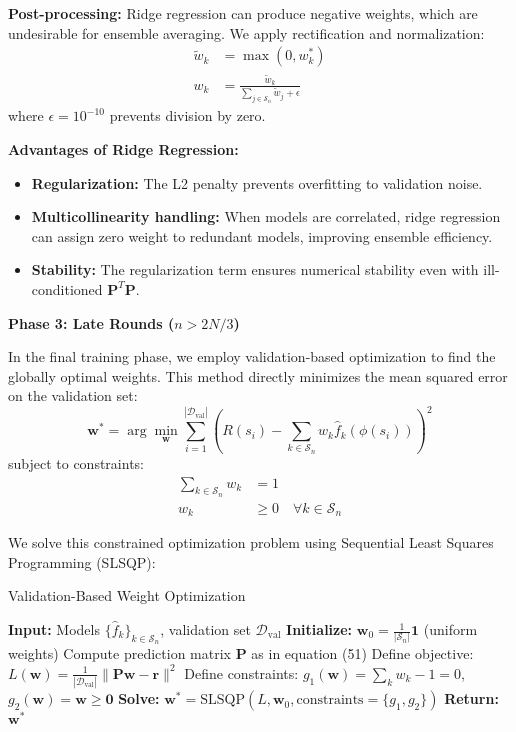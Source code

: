 \documentclass[conference]{IEEEtran}
\begin{document}
\textbf{Post-processing:} Ridge regression can produce negative weights, which are undesirable for ensemble averaging. We apply rectification and normalization:
\begin{align}
\tilde{w}_k &= \max(0, w_k^*) \\
w_k &= \frac{\tilde{w}_k}{\sum_{j \in \mathcal{S}_n} \tilde{w}_j + \epsilon}
\end{align}
where $\epsilon = 10^{-10}$ prevents division by zero.

\textbf{Advantages of Ridge Regression:}
\begin{itemize}
    \item \textbf{Regularization:} The L2 penalty prevents overfitting to validation noise.
    \item \textbf{Multicollinearity handling:} When models are correlated, ridge regression can assign zero weight to redundant models, improving ensemble efficiency.
    \item \textbf{Stability:} The regularization term ensures numerical stability even with ill-conditioned $\mathbf{P}^T\mathbf{P}$.
\end{itemize}

\textbf{Phase 3: Late Rounds ($n > 2N/3$)}

In the final training phase, we employ validation-based optimization to find the globally optimal weights. This method directly minimizes the mean squared error on the validation set:
\begin{equation}
\mathbf{w}^* = \arg\min_{\mathbf{w}} \sum_{i=1}^{|\mathcal{D}_{\text{val}}|} \left(R(s_i) - \sum_{k \in \mathcal{S}_n} w_k \hat{f}_k(\phi(s_i))\right)^2
\end{equation}
subject to constraints:
\begin{align}
\sum_{k \in \mathcal{S}_n} w_k &= 1 \\
w_k &\geq 0 \quad \forall k \in \mathcal{S}_n
\end{align}

We solve this constrained optimization problem using Sequential Least Squares Programming (SLSQP):
\begin{algorithm}[H]
\caption{Validation-Based Weight Optimization}
\begin{algorithmic}[1]
\STATE \textbf{Input:} Models $\{\hat{f}_k\}_{k \in \mathcal{S}_n}$, validation set $\mathcal{D}_{\text{val}}$
\STATE \textbf{Initialize:} $\mathbf{w}_0 = \frac{1}{|\mathcal{S}_n|}\mathbf{1}$ (uniform weights)
\STATE Compute prediction matrix $\mathbf{P}$ as in equation (51)
\STATE Define objective: $L(\mathbf{w}) = \frac{1}{|\mathcal{D}_{\text{val}}|}\|\mathbf{P}\mathbf{w} - \mathbf{r}\|^2$
\STATE Define constraints: $g_1(\mathbf{w}) = \sum_k w_k - 1 = 0$, $g_2(\mathbf{w}) = \mathbf{w} \geq \mathbf{0}$
\STATE \textbf{Solve:} $\mathbf{w}^* = \text{SLSQP}(L, \mathbf{w}_0, \text{constraints}=\{g_1, g_2\})$
\STATE \textbf{Return:} $\mathbf{w}^*$
\end{algorithmic}
\end{algorithm}
\end{document}
